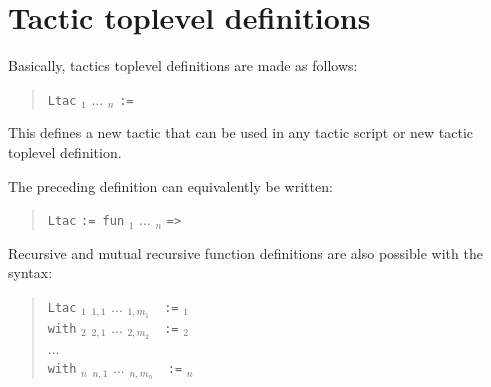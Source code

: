 \section{Tactic toplevel definitions}

Basically, tactics toplevel definitions are made as follows:
%
%
\begin{quote}
{\tt Ltac} {\ident} {\ident}$_1$ ... {\ident}$_n$ {\tt :=}
{\tacexpr}
\end{quote}
This defines a new tactic that can be used in any tactic script or new
tactic toplevel definition.

\Rem The preceding definition can equivalently be written:
\begin{quote}
{\tt Ltac} {\ident} {\tt := fun} {\ident}$_1$ ... {\ident}$_n$
{\tt =>} {\tacexpr}
\end{quote}
Recursive and mutual recursive function definitions are also
possible with the syntax:
\begin{quote}
{\tt Ltac} {\ident}$_1$ {\ident}$_{1,1}$ ...
{\ident}$_{1,m_1}$~~{\tt :=} {\tacexpr}$_1$\\
{\tt with} {\ident}$_2$ {\ident}$_{2,1}$ ... {\ident}$_{2,m_2}$~~{\tt :=}
{\tacexpr}$_2$\\
...\\
{\tt with} {\ident}$_n$ {\ident}$_{n,1}$ ... {\ident}$_{n,m_n}$~~{\tt :=}
{\tacexpr}$_n$
\end{quote}


\endinput


\subsection{Permutation on closed lists}

\begin{figure}[b]
\begin{center}
\fbox{\begin{minipage}{0.95\textwidth}
\begin{coq_example*}
Section Sort.
Variable A : Set.
Inductive permut : list A -> list A -> Prop :=
  | permut_refl   : forall l, permut l l
  | permut_cons   :
      forall a l0 l1, permut l0 l1 -> permut (a :: l0) (a :: l1)
  | permut_append : forall a l, permut (a :: l) (l ++ a :: nil)
  | permut_trans  :
      forall l0 l1 l2, permut l0 l1 -> permut l1 l2 -> permut l0 l2.
End Sort.
\end{coq_example*}
\end{center}
\caption{Definition of the permutation predicate}
\label{permutpred}
\end{figure}


